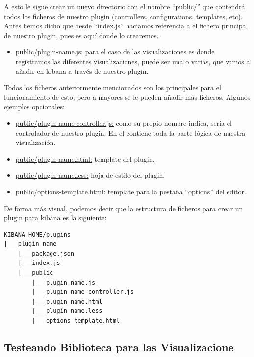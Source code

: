 \documentclass[a4paper, 12pt]{book}
\begin{document}
A esto le sigue crear un nuevo directorio con el nombre “public/” que contendrá todos los ficheros de nuestro plugin (controllers, configurations, templates, etc). Antes hemos dicho que desde “index.js” hacíamos referencia a el fichero principal de nuestro plugin, pues es aquí donde lo crearemos.

\begin{itemize}
    \item \underline{public/plugin-name.js:} para el caso de las visualizaciones es donde registramos las diferentes visualizaciones, puede ser una o varias, que vamos a añadir en kibana a través de nuestro plugin.
\end{itemize}

Todos los ficheros anteriormente mencionados son los principales para el funcionamiento de esto; pero a mayores se le pueden añadir más ficheros. Algunos ejemplos opcionales:

\begin{itemize}
    \item \underline{public/plugin-name-controller.js:} como su propio nombre indica, sería el controlador de nuestro plugin. En el contiene toda la parte lógica de nuestra visualización.
    \item \underline{public/plugin-name.html:} template del plugin.
    \item \underline{public/plugin-name.less:} hoja de estilo del plugin.
    \item \underline{public/options-template.html:} template para la pestaña “options” del editor.
\end{itemize}

De forma más visual, podemos decir que la estructura de ficheros para crear un plugin para kibana es la siguiente:


\begin{lstlisting}[frame=single]
KIBANA_HOME/plugins
|___plugin-name
    |___package.json
    |___index.js
    |___public
        |___plugin-name.js
        |___plugin-name-controller.js
        |___plugin-name.html
        |___plugin-name.less
        |___options-template.html

\end{lstlisting}



\subsection{Testeando Biblioteca para las Visualizacione}
\end{document}
